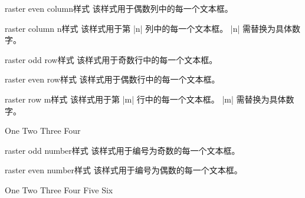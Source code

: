 \begin{docTcbKey}[][doc new=2014-11-10]{raster even column}{}{样式}
该样式用于偶数列中的每一个文本框。
\end{docTcbKey}


\begin{docTcbKey}[][doc new=2014-11-10]{raster column n}{}{样式}
该样式用于第 |n| 列中的每一个文本框。
|n| 需替换为具体数字。
\end{docTcbKey}


\begin{docTcbKey}[][doc new=2014-11-10]{raster odd row}{}{样式}
该样式用于奇数行中的每一个文本框。
\end{docTcbKey}

\begin{docTcbKey}[][doc new=2014-11-10]{raster even row}{}{样式}
该样式用于偶数行中的每一个文本框。
\end{docTcbKey}


\begin{docTcbKey}[][doc new=2014-11-10]{raster row m}{}{样式}
该样式用于第 |m| 行中的每一个文本框。
|m| 需替换为具体数字。
\begin{dispExample}
\begin{tcbitemize}[size=small,colframe=red!50!black,colback=red!10!white,
  raster row 2/.style={colframe=blue!50!black,colback=blue!10!white}]
  \tcbitem One
  \tcbitem Two
  \tcbitem Three
  \tcbitem Four
\end{tcbitemize}
\end{dispExample}
\end{docTcbKey}

\begin{docTcbKey}[][doc new=2014-11-10]{raster odd number}{}{样式}
该样式用于编号为奇数的每一个文本框。
\end{docTcbKey}

\begin{docTcbKey}[][doc new=2014-11-10]{raster even number}{}{样式}
该样式用于编号为偶数的每一个文本框。
\begin{dispExample}
\begin{tcbitemize}[size=small,colframe=red!50!black,colback=red!10!white,
  raster columns=3,
  raster even number/.style={colframe=blue!50!black,colback=blue!10!white}]
  \tcbitem One
  \tcbitem Two
  \tcbitem Three
  \tcbitem Four
  \tcbitem Five
  \tcbitem Six
\end{tcbitemize}
\end{dispExample}
\end{docTcbKey}


